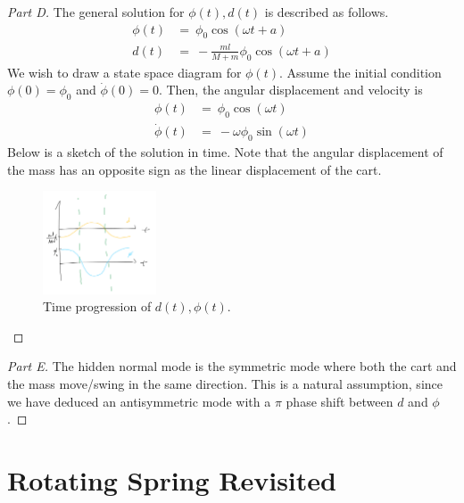 \documentclass{article}
\numberwithin{equation}{section}
\begin{document}
\begin{proof}[Part D]
    The general solution for $\phi(t), d(t)$ is described as follows. 
    \begin{align}
        \phi(t) & = \ \phi_0 \cos(\omega t + a) \\ 
        d(t) & = \ - \frac {ml}{M + m} \phi_0 \cos(\omega t + a)
    \end{align}
    We wish to draw a state space diagram for $\phi(t)$. Assume the 
    initial condition $\phi(0) = \phi_0$ and $\dot \phi(0) = 0$. Then, 
    the angular displacement and velocity is
    \begin{align}
        \phi(t) & = \ \phi_0 \cos(\omega t) \\ 
        \dot \phi(t) & = \ -\omega\phi_0 \sin(\omega t)
    \end{align}
    Below is a sketch of the solution in time. Note that the angular 
    displacement of the mass has an opposite sign as the linear displacement of the cart. 
    \begin{figure}[h]
        \centering
        \includegraphics[width=0.3\textwidth]{Q3_statespace.png} %
        \caption{Time progression of $ d(t), \phi(t)$. }
        \label{fig:example}
    \end{figure}
    
    
\end{proof}

\begin{proof}[Part E]
    The hidden normal mode is the symmetric mode where both the cart 
    and the mass move/swing in the same direction. This is a natural 
    assumption, since we have deduced an antisymmetric mode with a $\pi$ 
    phase shift between $d$ and $\phi$. 
\end{proof}

\section{Rotating Spring Revisited}
\end{document}
